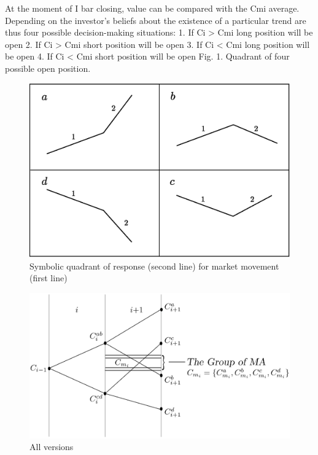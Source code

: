 \documentclass{tewiart}
\begin{document}
At the moment of I bar closing, value can be compared with the Cmi average. Depending on the investor's beliefs about the existence of a particular trend are thus four possible decision-making situations:
1. If Ci  > Cmi  long position will be open
2. If Ci  > Cmi  short position will be open
3. If Ci  < Cmi  long position will be open
4. If Ci  < Cmi  short position will be open
Fig. 1. Quadrant of four possible open position.

\begin{figure}[h]
 \centering
 \includegraphics[width=\textwidth]{Rysunek0_all2.eps}
 \caption{Symbolic quadrant of response (second line) for market movement (first line)}
\end{figure}
\FloatBarrier

\begin{figure}[h]
\centering
\centering 
\includegraphics[width=\textwidth]{rysunek1pp.eps}
\caption{All versions}
\end{figure}
\FloatBarrier
\end{document}
